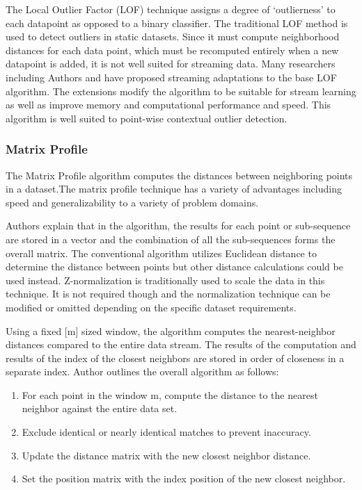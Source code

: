 The Local Outlier Factor (LOF) technique assigns a degree of `outlierness' to each datapoint as opposed to a binary classifier. The traditional LOF method is used to detect outliers in static datasets. Since it must compute neighborhood distances for each data point, which must be recomputed entirely when a new datapoint is added, it is not well suited for streaming data. Many researchers including Authors \cite{dilof-data-streams} and \cite{fast-memory-efficent-lof-milof} have proposed streaming adaptations to the base LOF algorithm. The extensions modify the algorithm to be suitable for stream learning as well as improve memory and computational performance and speed. This algorithm is well suited to point-wise contextual outlier detection.

\subsubsection{Matrix Profile} %
\label{ref_matrix-profile-alg}
The Matrix Profile algorithm computes the distances between neighboring points in a dataset.The matrix profile technique has a variety of advantages including speed and generalizability to a variety of problem domains. 

Authors \cite{yeh2016matrix-profile-1} explain that in the algorithm, the results for each point or sub-sequence are stored in a vector and the combination of all the sub-sequences forms the overall matrix. The conventional algorithm utilizes Euclidean distance to determine the distance between points but other distance calculations could be used instead. Z-normalization is traditionally used to scale the data in this technique. It is not required though and the normalization technique can be modified or omitted depending on the specific dataset requirements.

Using a fixed [m] sized window, the algorithm computes the nearest-neighbor distances compared to the entire data stream. The results of the computation and results of the index of the closest neighbors are stored in order of closeness in a separate index. Author \cite{matrix-profile-intro} outlines the overall algorithm as follows:
\begin{enumerate}
    \item For each point in the window m, compute the distance to the nearest neighbor against the entire data set.
    \item Exclude identical or nearly identical matches to prevent inaccuracy.
    \item Update the distance matrix with the new closest neighbor distance.
    \item Set the position matrix with the index position of the new closest neighbor.
\end{enumerate}

